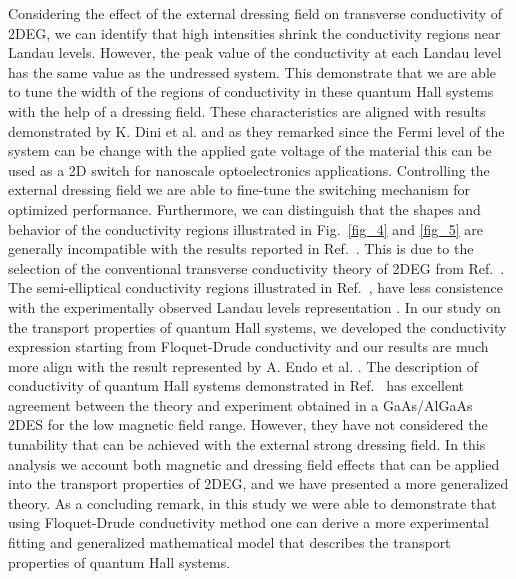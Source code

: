 Considering the effect of the external dressing field on transverse conductivity of 2DEG, we can identify that high intensities shrink the conductivity regions near Landau levels. However, the peak value of the conductivity at each Landau level has the same value as the undressed system. This demonstrate that we are able to tune the width of the regions of conductivity in these quantum Hall systems with the help of a dressing field.
These characteristics are aligned with results demonstrated by K. Dini et al.\cite{dini16} and as they remarked since the Fermi level of the system can be change with the applied gate voltage of the material this can be used as a 2D switch for nanoscale optoelectronics applications. Controlling  the external dressing field we are able to fine-tune the switching mechanism for optimized performance.
Furthermore, we can distinguish that the shapes and behavior of the conductivity regions illustrated in Fig.~\ref{fig_4} and \ref{fig_5} are generally incompatible with the results reported in Ref.~\cite{dini16}. This is due to the selection of the conventional transverse conductivity theory of 2DEG from Ref.~\cite{ando74_1,ando82}. The semi-elliptical conductivity regions illustrated in Ref.~\cite{dini16,ando74_1,ando82}, have less consistence with the experimentally observed Landau levels representation \cite{endo09}.
In our study on the transport properties of quantum Hall systems, we developed the conductivity expression starting from Floquet-Drude conductivity \cite{wackerl20} and our results are much more align with the result represented by A. Endo et al. \cite{endo09}.
The description of conductivity of quantum Hall systems demonstrated in Ref.~\cite{endo09} has excellent agreement between the theory and experiment obtained in a GaAs/AlGaAs 2DES for the low magnetic field range. However, they have not considered the tunability that can be achieved with the external strong dressing field. In this analysis we account both magnetic and dressing field effects that can be applied into the transport properties of 2DEG, and we have presented a more generalized theory. As a concluding remark, in this study we were able to demonstrate that using Floquet-Drude conductivity method one can derive a more experimental fitting and generalized mathematical model that describes the transport properties of quantum Hall systems.
